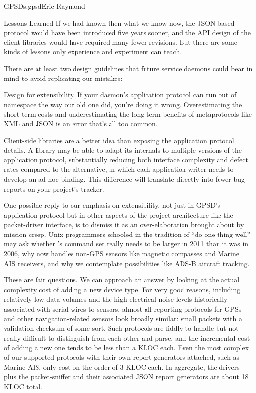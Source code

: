 \begin{aosachapter}{GPSD}{s:gpsd}{Eric Raymond}
\begin{aosasect1}{Lessons Learned}
If we had known then what we know now, the JSON-based protocol would
have been introduced five years sooner, and the API design of the
client libraries would have required many fewer revisions. But there
are some kinds of lessons only experience and experiment can teach.

There are at least two design guidelines that future service daemons
could bear in mind to avoid replicating our mistakes:

\begin{aosaenumerate}

  \item Design for extensibility.  If your daemon's application
    protocol can run out of namespace the way our old one did, you're
    doing it wrong. Overestimating the short-term costs and
    underestimating the long-term benefits of metaprotocols like XML
    and JSON is an error that's all too common.

  \item Client-side libraries are a better idea than exposing the
    application protocol details. A library may be able to adapt its
    internals to multiple versions of the application protocol,
    substantially reducing both interface complexity and defect rates
    compared to the alternative, in which each application writer needs to
    develop an ad hoc binding.  This difference will translate
    directly into fewer bug reports on your project's tracker.

\end{aosaenumerate}

One possible reply to our emphasis on extensibility, not just in
GPSD's application protocol but in other aspects of the project
architecture like the packet-driver interface, is to dismiss it as an
over-elaboration brought about by mission creep.  Unix programmers
schooled in the tradition of ``do one thing well'' may ask whether
's command set really needs to be larger in 2011 than it
was in 2006, why  now handles non-GPS sensors like magnetic
compasses and Marine AIS receivers, and why we contemplate
possibilities like ADS-B aircraft tracking.

These are fair questions. We can approach an answer by looking at the
actual complexity cost of adding a new device type.  For very good
reasons, including relatively low data volumes and the high
electrical-noise levels historically associated with serial wires to
sensors, almost all reporting protocols for GPSs and other
navigation-related sensors look broadly similar: small packets with a
validation checksum of some sort.  Such protocols are fiddly to handle
but not really difficult to distinguish from each other and parse, and
the incremental cost of adding a new one tends to be less than a KLOC
each. Even the most complex of our supported protocols with their own
report generators attached, such as Marine AIS, only cost on the order
of 3 KLOC each. In aggregate, the drivers plus the packet-sniffer and
their associated JSON report generators are about 18 KLOC total.


\end{aosasect1}
\end{aosachapter}
